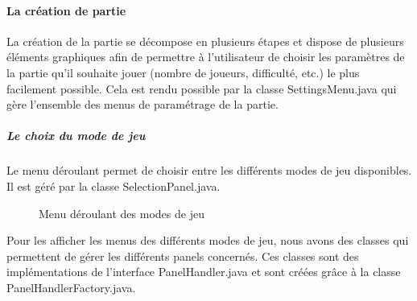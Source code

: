 \paragraph{La création de partie}

La création de la partie se décompose en plusieurs étapes et dispose de plusieurs éléments graphiques afin de permettre à l'utilisateur de choisir les paramètres de la partie qu'il souhaite jouer (nombre de joueurs, difficulté, etc.) le plus facilement possible. Cela est rendu possible par la classe SettingsMenu.java qui gère l'ensemble des menus de paramétrage de la partie.

\subparagraph*{Le choix du mode de jeu}

Le menu déroulant permet de choisir entre les différents modes de jeu disponibles. Il est géré par la classe SelectionPanel.java.

\begin{figure}
    \centering
    \caption{Menu déroulant des modes de jeu}
    \label{fig:ModeSelection}
\end{figure}

Pour les afficher les menus des différents modes de jeu, nous avons des classes qui permettent de gérer les différents panels concernés. Ces classes sont des implémentations de l'interface PanelHandler.java et sont créées grâce à la classe PanelHandlerFactory.java.
